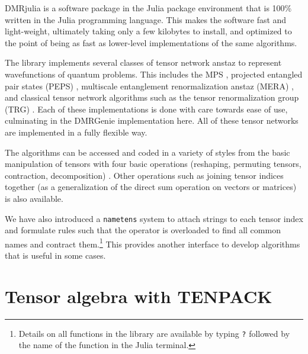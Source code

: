 \documentclass{juliacon}
\begin{document}
DMRjulia is a software package in the Julia package environment that is 100\% written in the Julia programming language. This makes the software fast and light-weight, ultimately taking only a few kilobytes to install, and optimized to the point of being as fast as lower-level implementations of the same algorithms.

The library implements several classes of tensor network anstaz to represent wavefunctions of quantum problems. This includes the MPS \cite{verstraete2006matrix,baker2024bundled}, projected entangled pair states (PEPS) \cite{verstraete2004renormalization}, multiscale entanglement renormalization anstaz (MERA) \cite{vidal2007entanglement}, and classical tensor network algorithms such as the tensor renormalization group (TRG) \cite{levin2007tensor}. Each of these implementations is done with care towards ease of use, culminating in the DMRGenie implementation here.  All of these tensor networks are implemented in a fully flexible way.

The algorithms can be accessed and coded in a variety of styles from the basic manipulation of tensors with four basic operations (reshaping, permuting tensors, contraction, decomposition) \cite{bakerCJP21,dmrjulia1}. Other operations such as joining tensor indices together (as a generalization of the direct sum operation on vectors or matrices) is also available. 

We have also introduced a {\tt nametens} system to attach strings to each tensor index and formulate rules such that the {\tt *} operator is overloaded to find all common names and contract them.\footnote{Details on all functions in the library are available by typing {\tt ?} followed by the name of the function in the Julia terminal.} This provides another interface to develop algorithms that is useful in some cases.


\section{Tensor algebra with TENPACK}
\end{document}
